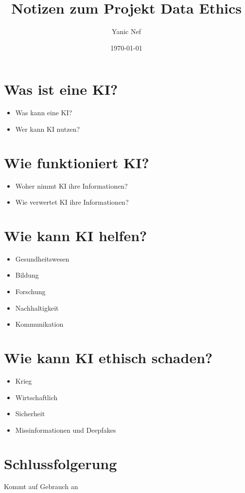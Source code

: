 \documentclass{article}
\title{Notizen zum Projekt Data Ethics}
\author{Yanic Nef}
\date{\today}
\begin{document}
\maketitle


\tableofcontents



\section{Was ist eine KI?}
\begin{itemize}
    \item Was kann eine KI?
    \item Wer kann KI nutzen?
\end{itemize}

\section{Wie funktioniert KI?}
\begin{itemize}
    \item Woher nimmt KI ihre Informationen?
    \item Wie verwertet KI ihre Informationen?
\end{itemize}

\section{Wie kann KI helfen?}
\begin{itemize}
\item Gesundheitswesen
\item Bildung
\item Forschung
\item Nachhaltigkeit
\item Kommunikation
\end{itemize}

\section{Wie kann KI ethisch schaden?}
\begin{itemize}
    \item Krieg
    \item Wirtschaftlich
    \item Sicherheit
    \item Missinformationen und Deepfakes
\end{itemize}

\section{Schlussfolgerung}
Kommt auf Gebrauch an

\printbibliography
\end{document}
